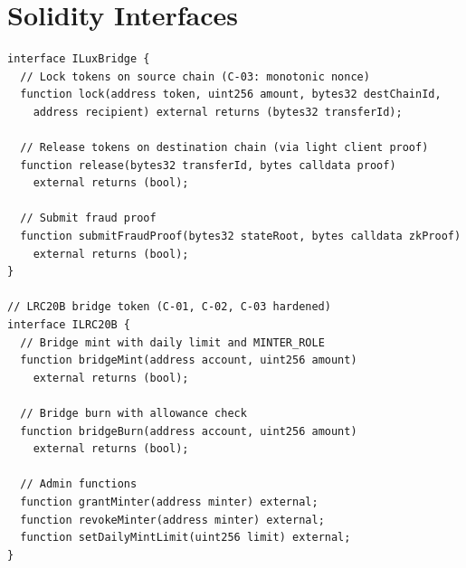 \section{Solidity Interfaces}


\begin{verbatim}
interface ILuxBridge {
  // Lock tokens on source chain (C-03: monotonic nonce)
  function lock(address token, uint256 amount, bytes32 destChainId,
    address recipient) external returns (bytes32 transferId);

  // Release tokens on destination chain (via light client proof)
  function release(bytes32 transferId, bytes calldata proof)
    external returns (bool);

  // Submit fraud proof
  function submitFraudProof(bytes32 stateRoot, bytes calldata zkProof)
    external returns (bool);
}

// LRC20B bridge token (C-01, C-02, C-03 hardened)
interface ILRC20B {
  // Bridge mint with daily limit and MINTER_ROLE
  function bridgeMint(address account, uint256 amount)
    external returns (bool);

  // Bridge burn with allowance check
  function bridgeBurn(address account, uint256 amount)
    external returns (bool);

  // Admin functions
  function grantMinter(address minter) external;
  function revokeMinter(address minter) external;
  function setDailyMintLimit(uint256 limit) external;
}
\end{verbatim}

